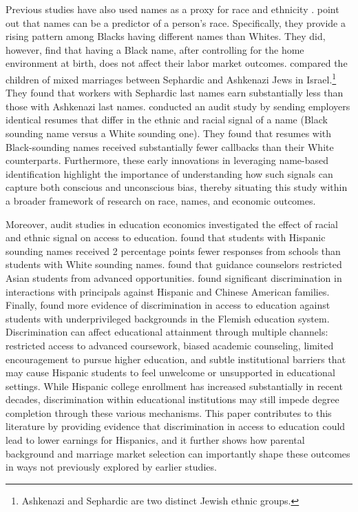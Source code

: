 Previous studies have also used names as a proxy for race and ethnicity \autocite{fryer2004causes, rubinstein2014pride, bertrand2004emily}. \textcite{fryer2004causes} point out that names can be a predictor of a person's race. Specifically, they provide a rising pattern among Blacks having different names than Whites. They did, however, find that having a Black name, after controlling for the home environment at birth, does not affect their labor market outcomes. \textcite{rubinstein2014pride} compared the children of mixed marriages between Sephardic and Ashkenazi Jews in Israel.\footnote{Ashkenazi and Sephardic are two distinct Jewish ethnic groups.} They found that workers with Sephardic last names earn substantially less than those with Ashkenazi last names. \textcite{bertrand2004emily} conducted an audit study by sending employers identical resumes that differ in the ethnic and racial signal of a name (Black sounding name versus a White sounding one). They found that resumes with Black-sounding names received substantially fewer callbacks than their White counterparts. Furthermore, these early innovations in leveraging name-based identification highlight the importance of understanding how such signals can capture both conscious and unconscious bias, thereby situating this study within a broader framework of research on race, names, and economic outcomes.

Moreover, audit studies in education economics investigated the effect of racial and ethnic signal on access to education. \textcite{bergman2018education} found that students with Hispanic sounding names received 2 percentage points fewer responses from schools than students with White sounding names. \textcite{janssen2022guidance} found that guidance counselors restricted Asian students from advanced opportunities. \textcite{gaddis2024racial} found significant discrimination in interactions with principals against Hispanic and Chinese American families. Finally, \textcite{bourabain2023school} found more evidence of discrimination in access to education against students with underprivileged backgrounds in the Flemish education system. Discrimination can affect educational attainment through multiple channels: restricted access to advanced coursework, biased academic counseling, limited encouragement to pursue higher education, and subtle institutional barriers that may cause Hispanic students to feel unwelcome or unsupported in educational settings. While Hispanic college enrollment has increased substantially in recent decades, discrimination within educational institutions may still impede degree completion through these various mechanisms. This paper contributes to this literature by providing evidence that discrimination in access to education could lead to lower earnings for Hispanics, and it further shows how parental background and marriage market selection can importantly shape these outcomes in ways not previously explored by earlier studies.

